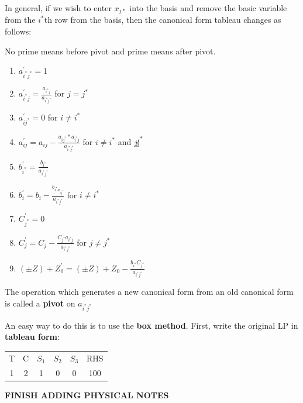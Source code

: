 \documentclass{article}
\begin{document}
\begin{remark}
    In general, if we wish to enter \(x_{j*}\) into the basis and remove the basic variable 
    from the \(i^*\)th row from the basis, then the canonical form tableau changes as follows: \\
    \begin{note}
        No prime means before pivot and prime means after pivot.
    \end{note}
    \begin{enumerate}
        \item \(a_{i^*j^*}^{\prime}=1\) 
        \item \(a_{i^*j}^{\prime} =\frac{a_{i^*j}}{a_{i^*j^*}}\) for \(j=j^*\)
        \item \(a_{ij^*}^{\prime} =0\) for \(i\neq i^*\)
        \item \(a_{ij}^{\prime} =a_{ij}-\frac{a_{ij^*}*a_{i^*j}}{a_{i^*j^*}}\) for \(i\neq i^*\) and \(j\not j^*\)
        \item \(b_{i^*}^{\prime} =\frac{b_{i^*}}{a_{i^*j^*}}\)
        \item \(b_i^{\prime} =b_i-\frac{b_{i^*a_{ij^*}}}{a_{i^*j^*}}\) for \(i\neq i^*\)
        \item \(C_{j^*}^{\prime} =0\) 
        \item \(C_j^{\prime} =C_j-\frac{C_{j^*}a_{i^*j}}{a_{i^*j^*}}\) for \(j\neq j^*\)
        \item \((\pm Z)+Z_0^{\prime}=(\pm Z)+Z_0-\frac{b_{i^*}C_{j^*}}{a_{i^*j^*}}\)    
    \end{enumerate} 
    The operation which generates a new canonical form from an old canonical form is called a \textbf{pivot} on \(a_{i^*j^*}\) 
\end{remark}

An easy way to do this is to use the \textbf{box method}. First, write the original LP in 
\textbf{tableau form}: \\
\begin{tabular}{c c c c c | c}
    T & C & $S_1$ & $S_2$ & $S_3$ & RHS \\
    1 & 2 & 1 & 0 & 0 & 100 \\
\end{tabular}

\textbf{FINISH ADDING PHYSICAL NOTES}
\end{document}

